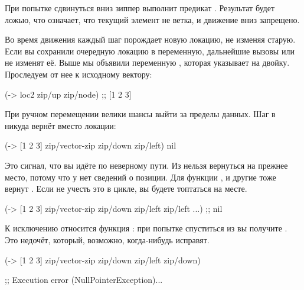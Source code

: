 При попытке сдвинуться вниз зиппер выполнит предикат . Результат
будет ложью, что означает, что текущий элемент не ветка, и движение вниз
запрещено.

Во время движения каждый шаг порождает новую локацию, не изменяя старую. Если вы
сохранили очередную локацию в переменную, дальнейшие вызовы  или
 не изменят её. Выше мы объявили переменную , которая
указывает на двойку. Проследуем от нее к исходному вектору:

\begin{english}
  \begin{clojure}
(-> loc2 zip/up zip/node)
;; [1 2 3]
  \end{clojure}
\end{english}

При ручном перемещении велики шансы выйти за пределы данных. Шаг в никуда вернёт
 вместо локации:

\begin{english}
  \begin{clojure}
(-> [1 2 3]
    zip/vector-zip
    zip/down
    zip/left)
nil
  \end{clojure}
\end{english}

Это сигнал, что вы идёте по неверному пути. Из  нельзя вернуться на
прежнее место, потому что у  нет сведений о позиции. Для 
функции ,  и другие тоже вернут . Если не
учесть это в цикле, вы будете топтаться на месте.

\begin{english}
  \begin{clojure}
(-> [1 2 3]
    zip/vector-zip
    zip/down
    zip/left
    zip/left
    ...)
;; nil
  \end{clojure}
\end{english}

К исключению относится функция : при попытке спуститься из  вы
получите . Это недочёт, который, возможно, когда-нибудь
исправят.

\begin{english}
  \begin{clojure}
(-> [1 2 3]
    zip/vector-zip
    zip/down
    zip/left
    zip/down)

;; Execution error (NullPointerException)...
  \end{clojure}
\end{english}

